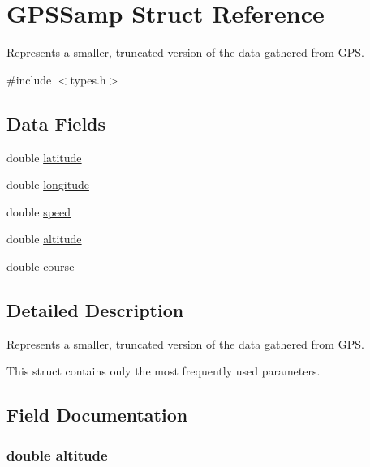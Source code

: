 \hypertarget{struct_g_p_s_samp}{}\section{G\+P\+S\+Samp Struct Reference}
\label{struct_g_p_s_samp}


Represents a smaller, truncated version of the data gathered from G\+PS.  




{\ttfamily \#include $<$types.\+h$>$}

\subsection*{Data Fields}
\begin{DoxyCompactItemize}
\item 
double \hyperlink{struct_g_p_s_samp_a76714bdbc5c536fa77dfb14533ff82a9}{latitude}
\item 
double \hyperlink{struct_g_p_s_samp_ac155e35fdeebafc89723a51520fb9fe6}{longitude}
\item 
double \hyperlink{struct_g_p_s_samp_a6dc6e6f3c75c509ce943163afb5dade7}{speed}
\item 
double \hyperlink{struct_g_p_s_samp_a2b13d276aee0d9fd646c8fa3647e869b}{altitude}
\item 
double \hyperlink{struct_g_p_s_samp_acaa2fde7e3fad7df8f5755347603d17b}{course}
\end{DoxyCompactItemize}


\subsection{Detailed Description}
Represents a smaller, truncated version of the data gathered from G\+PS. 

This struct contains only the most frequently used parameters. 

\subsection{Field Documentation}
\subsubsection[{\texorpdfstring{altitude}{altitude}}]{\setlength{\rightskip}{0pt plus 5cm}double altitude}\hypertarget{struct_g_p_s_samp_a2b13d276aee0d9fd646c8fa3647e869b}{}\label{struct_g_p_s_samp_a2b13d276aee0d9fd646c8fa3647e869b}
